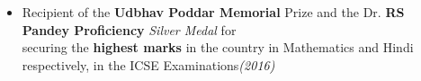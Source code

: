 \documentclass{article}
\newcommand{\xfilll}[2][1ex]{
\dimen0=#2\advance\dimen0 by #1
\leaders\hrule height \dimen0 depth -#1\hfill}
\begin{document}
\begin{itemize}[itemsep = -1 mm, leftmargin=*]
\item  Recipient of the {\bf Udbhav Poddar Memorial} Prize and the Dr. {\bf RS Pandey Proficiency} {\it Silver Medal} for \\securing the \textbf{highest marks} in the country in Mathematics and Hindi respectively, in the ICSE Examinations\hfill{\sl \small (2016)}
\end{itemize}


\vspace{-20pt}
\end{document}
